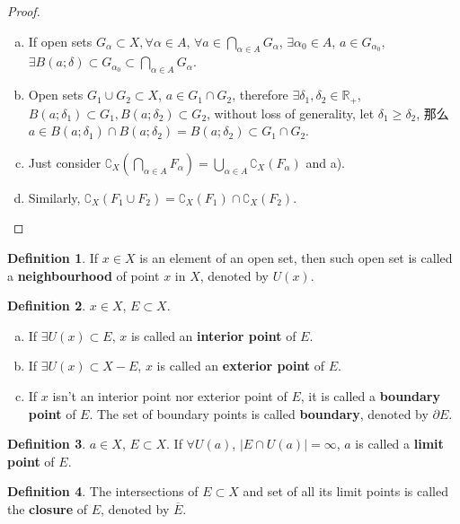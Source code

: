 \documentclass{article}
\theoremstyle{plain}
\theoremstyle{definition}
\newtheorem{dfn}{Definition}[section] %
\begin{document}
\begin{proof}
\begin{enumerate}[a)]
	\item If open sets $G_\alpha\subset X,\forall\alpha\in A$, $\forall a\in\bigcap\limits_{\alpha\in A}G_\alpha$, $\exists\alpha_0\in A$, $a\in G_{\alpha_0}$, $\exists B(a;\delta)\subset G_{\alpha_0}\subset \bigcap\limits_{\alpha\in A}G_\alpha$.
	\item Open sets $G_1\cup G_2\subset X$, $a\in G_1\cap G_2$, therefore $\exists\delta_1,\delta_2\in\mathbb{R}_+$, $B(a;\delta_1)\subset G_1,B(a;\delta_2)\subset G_2$, without loss of generality, let $\delta_1\geq\delta_2$, 那么$a\in B(a;\delta_1)\cap B(a;\delta_2)=B(a;\delta_2)\subset G_1\cap G_2$.
	\item Just consider $\complement_X
		\left(\bigcap_{\alpha\in A}F_\alpha\right)
		=\bigcup_{\alpha\in A}\complement_X(F_\alpha)$ and a).
	\item Similarly, $\complement_X\left(F_1\cup F_2\right)=\complement_X(F_1)\cap\complement_X(F_2)$.
	
\end{enumerate}
\end{proof}
\begin{dfn}\label{neighbourhood_metric}
If $x\in X$ is an element of an open set, then such open set is called a \textbf{neighbourhood} of point $x$ in $X$, denoted by $U(x)$.
\end{dfn}
\begin{dfn}\label{interior_metric}
$x\in X$, $E\subset X$.
\begin{enumerate}[a)]
\item If $\exists U(x)\subset E$, $x$ is called an \textbf{interior point} of $E$.
\item If $\exists U(x)\subset X-E$, $x$ is called an \textbf{exterior point} of $E$.
\item If $x$ isn't an interior point nor exterior point of $E$, it is called a \textbf{boundary point} of $E$. The set of boundary points is called \textbf{boundary}, denoted by $\partial E$.
\end{enumerate}
\end{dfn}
\begin{dfn}\label{limit_point_metric}
$a\in X$, $E\subset X$. If $\forall U(a)$, $\left|E\cap U(a)\right|=\infty$, $a$ is called a \textbf{limit point} of $E$.
\end{dfn}
\begin{dfn}\label{closure_metric}
The intersections of $E\subset X$ and set of all its limit points is called the \textbf{closure} of $E$, denoted by $\overline{E}$.
\end{dfn}
\end{document}
